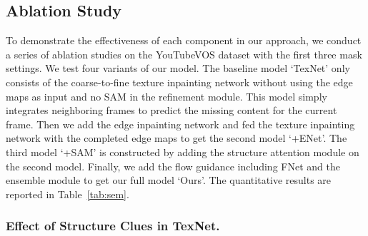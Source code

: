 %			
%			




\subsection{Ablation Study}
To demonstrate the effectiveness of each component in our approach, we conduct a series of ablation studies on the YouTubeVOS dataset with the first three mask settings. 
%
We test four variants of our model. 
The baseline model `TexNet' only consists of the coarse-to-fine texture inpainting network without using the edge maps as input and no SAM in the refinement module.
This model simply integrates neighboring frames to predict the missing content for the current frame.
%
Then we add the edge inpainting network and fed the texture inpainting network with the completed edge maps to get the second model `+ENet'.
The third model `+SAM' is constructed by adding the structure attention module on the second model. 
Finally, we add the flow guidance including FNet and the ensemble module to get our full model `Ours'.
The quantitative results are reported in Table~\ref{tab:sem}. 


\subsubsection{Effect of Structure Clues in TexNet.}


